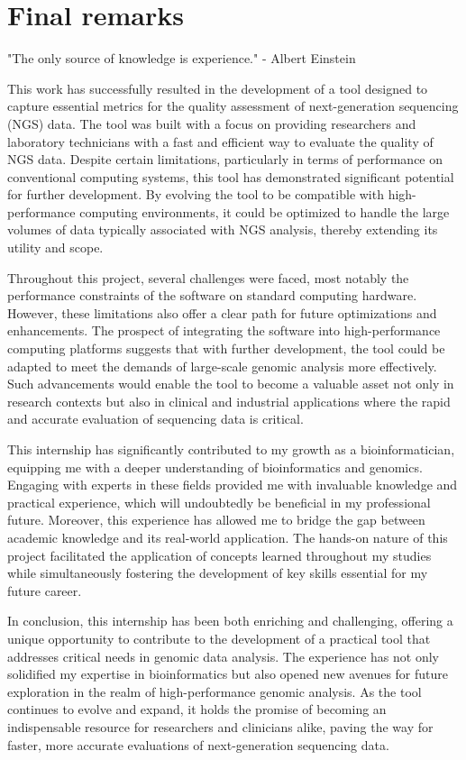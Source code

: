 \chapter{Final remarks}
\label{chapter:Final remarks}

\begin{introduction}
    "The only source of knowledge is experience." - Albert Einstein
\end{introduction}


This work has successfully resulted in the development of a tool designed to capture essential metrics for the quality assessment of next-generation sequencing (NGS) data. The tool was built with a focus on providing researchers and laboratory technicians with a fast and efficient way to evaluate the quality of NGS data. Despite certain limitations, particularly in terms of performance on conventional computing systems, this tool has demonstrated significant potential for further development. By evolving the tool to be compatible with high-performance computing environments, it could be optimized to handle the large volumes of data typically associated with NGS analysis, thereby extending its utility and scope.

Throughout this project, several challenges were faced, most notably the performance constraints of the software on standard computing hardware. However, these limitations also offer a clear path for future optimizations and enhancements. The prospect of integrating the software into high-performance computing platforms suggests that with further development, the tool could be adapted to meet the demands of large-scale genomic analysis more effectively. Such advancements would enable the tool to become a valuable asset not only in research contexts but also in clinical and industrial applications where the rapid and accurate evaluation of sequencing data is critical.

This internship has significantly contributed to my growth as a bioinformatician, equipping me with a deeper understanding of bioinformatics and genomics. Engaging with experts in these fields provided me with invaluable knowledge and practical experience, which will undoubtedly be beneficial in my professional future. Moreover, this experience has allowed me to bridge the gap between academic knowledge and its real-world application. The hands-on nature of this project facilitated the application of concepts learned throughout my studies while simultaneously fostering the development of key skills essential for my future career.

In conclusion, this internship has been both enriching and challenging, offering a unique opportunity to contribute to the development of a practical tool that addresses critical needs in genomic data analysis. The experience has not only solidified my expertise in bioinformatics but also opened new avenues for future exploration in the realm of high-performance genomic analysis. As the tool continues to evolve and expand, it holds the promise of becoming an indispensable resource for researchers and clinicians alike, paving the way for faster, more accurate evaluations of next-generation sequencing data.
